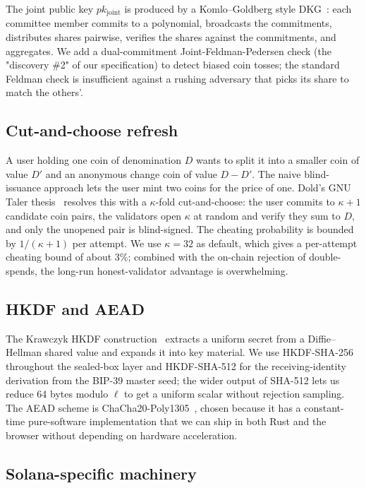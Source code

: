 The joint public key $pk_{\mathrm{joint}}$ is produced by a Komlo--Goldberg style DKG~\cite{komlogoldberg2020}: each committee member commits to a polynomial, broadcasts the commitments, distributes shares pairwise, verifies the shares against the commitments, and aggregates. We add a dual-commitment Joint-Feldman-Pedersen check (the "discovery \#2" of our specification) to detect biased coin tosses; the standard Feldman check is insufficient against a rushing adversary that picks its share to match the others'.

\subsection{Cut-and-choose refresh}

A user holding one coin of denomination $D$ wants to split it into a smaller coin of value $D'$ and an anonymous change coin of value $D - D'$. The naive blind-issuance approach lets the user mint two coins for the price of one. Dold's GNU Taler thesis~\cite{dold2019} resolves this with a $\kappa$-fold cut-and-choose: the user commits to $\kappa + 1$ candidate coin pairs, the validators open $\kappa$ at random and verify they sum to $D$, and only the unopened pair is blind-signed. The cheating probability is bounded by $1/(\kappa + 1)$ per attempt. We use $\kappa = 32$ as default, which gives a per-attempt cheating bound of about $3\%$; combined with the on-chain rejection of double-spends, the long-run honest-validator advantage is overwhelming.

\subsection{HKDF and AEAD}

The Krawczyk HKDF construction~\cite{krawczyk2010} extracts a uniform secret from a Diffie--Hellman shared value and expands it into key material. We use HKDF-SHA-256 throughout the sealed-box layer and HKDF-SHA-512 for the receiving-identity derivation from the BIP-39 master seed; the wider output of SHA-512 lets us reduce 64 bytes modulo $\ell$ to get a uniform scalar without rejection sampling. The AEAD scheme is ChaCha20-Poly1305~\cite{rfc7539}, chosen because it has a constant-time pure-software implementation that we can ship in both Rust and the browser without depending on hardware acceleration.

\subsection{Solana-specific machinery}


